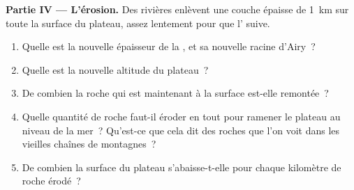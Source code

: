 \begin{problem}
\noindent\textbf{Partie IV --- L'érosion.}
Des rivières enlèvent une couche épaisse de \qty{1}{km} sur toute la surface du plateau,
assez lentement pour que l' suive.
\begin{enumerate}[resume]
  \item Quelle est la nouvelle épaisseur de la , et sa nouvelle racine d'Airy~?
  \item Quelle est la nouvelle altitude du plateau~?
  \item De combien la roche qui est maintenant à la surface est-elle remontée~?
  \item Quelle quantité de roche faut-il éroder en tout pour ramener le plateau au niveau de la
        mer~? Qu'est-ce que cela dit des roches que l'on voit dans les vieilles chaînes de montagnes~?
  \item De combien la surface du plateau s'abaisse-t-elle pour chaque
        kilomètre de roche érodé~?
\end{enumerate}
\end{problem}
